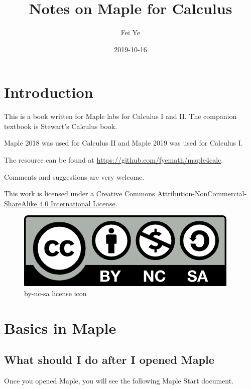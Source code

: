 \documentclass[]{book}
\title{Notes on Maple for Calculus}
\author{Fei Ye}
\date{2019-10-16}
\theoremstyle{definition}
\theoremstyle{definition}
\theoremstyle{definition}
\theoremstyle{remark}
\begin{document}
\maketitle

{
\setcounter{tocdepth}{1}
\tableofcontents
}
\hypertarget{introduction}{%
\chapter*{Introduction}\label{introduction}}

This is a book written for Maple labs for Calculus I and II. The companion textbook is Stewart's Calculus book.

Maple 2018 was used for Calculus II and Maple 2019 was used for Calculus I.

The resource can be found at \url{https://github.com/fyemath/maple4calc}.

Comments and suggestions are very welcome.

This work is licensed under a \href{https://creativecommons.org/licenses/by-nc-sa/4.0/}{Creative Commons Attribution-NonCommercial-ShareAlike 4.0 International License}.

\begin{figure}
\centering
\includegraphics{figs/by-nc-sa.png}
\caption{by-nc-sa license icon}
\end{figure}

\hypertarget{basics-in-maple}{%
\chapter{Basics in Maple}\label{basics-in-maple}}

\hypertarget{what-should-i-do-after-i-opened-maple}{%
\section{What should I do after I opened Maple}\label{what-should-i-do-after-i-opened-maple}}

Once you opened Maple, you will see the following Maple Start document.
\end{document}
